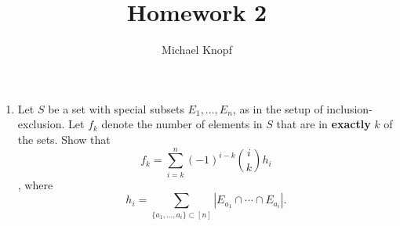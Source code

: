 \documentclass[12pt]{article}
\begin{document}
 
 
\title{Homework 2}
\author{Michael Knopf}
 
\maketitle


\begin{enumerate}
\item Let $S$ be a set with special subsets $E_1, \dots , E_n$, as in the setup of inclusion-exclusion.  Let $f_k$ denote the number of elements in $S$ that are in \textbf{exactly} $k$ of the sets.  Show that $$f_k = \sum_{i=k}^n (-1)^{i-k} \binom{i}{k} h_i$$, where $$h_i = \sum_{\{a_1, \dots , a_i \} \subset [n]} |E_{a_1} \cap \cdots \cap E_{a_i}|.$$
\end{enumerate}
\end{document}
